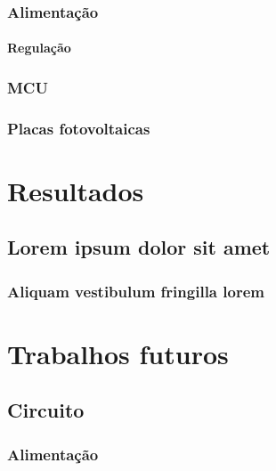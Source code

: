 \documentclass[
	12pt,				%
	openany,			%
	twoside,			%
	a4paper,			%
	english,			%
	french,				%
	spanish,			%
	brazil,				%
	]{abntex2}
\begin{document}
\section{Alimentação}
\subsection{Regulação}
\section{MCU}
\section{Placas fotovoltaicas}

\part{Resultados}

\chapter{Lorem ipsum dolor sit amet}

\section{Aliquam vestibulum fringilla lorem}

\lipsum[1]

\lipsum[2-3]


\part{Trabalhos futuros}
\chapter{Circuito}

\section{Alimentação}
\end{document}
